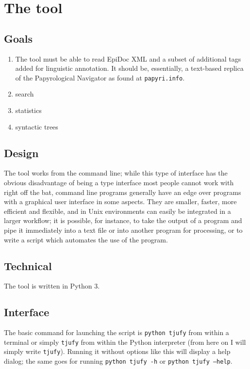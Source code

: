 \chapter{The tool}
\label{chp:design}
\minitoc\mtcskip
\section{Goals} %
\label{sec:tool-goals}


\begin{enumerate} 
  \item The tool must be able to read EpiDoc XML and a subset of
      additional tags added for linguistic annotation. It should be,
      essentially, a text-based replica of the Papyrological Navigator as found
      at \texttt{papyri.info}. 
    \item search 
    \item statistics
    \item syntactic trees
\end{enumerate}

\section{Design} %

The tool works from the command line; while this type of interface has the
obvious disadvantage of being a type interface most people cannot work with
right off the bat, command line programs generally have an edge over programs
with a graphical user interface in some aspects. They are smaller, faster, more
efficient and flexible, and in Unix environments can easily be integrated in a
larger workflow; it is possible, for instance, to take the output of a program
and pipe it immediately into a text file or into another program for
processing, or to write a script which automates the use of the program.


\section{Technical} %
\label{sec:tool-technical}
The tool is written in Python 3. 

\section{Interface} %
\label{sec:interface}

The basic command for launching the script is \texttt{python tjufy} from within
a terminal or simply \texttt{tjufy} from within the Python interpreter (from
here on I will simply write \texttt{tjufy}). Running it without options like this
will display a help dialog; the same goes for running \texttt{python tjufy -h}
or \texttt{python tjufy --help}.




